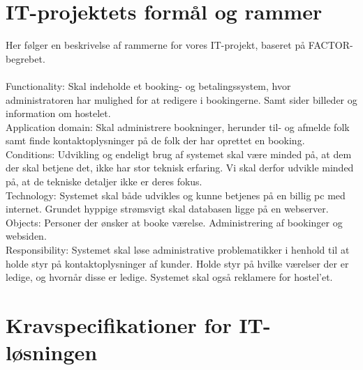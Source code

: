 \documentclass[12pt,a4paper]{article}
\begin{document}
\newpage
\section{IT-projektets formål og rammer}
Her følger en beskrivelse af rammerne for vores IT-projekt, baseret på FACTOR-begrebet.
\\\\
Functionality: Skal indeholde et booking- og betalingssystem, hvor administratoren har mulighed for at redigere i bookingerne. Samt sider billeder og information om hostelet. \\

Application domain: Skal administrere bookninger, herunder til- og afmelde folk samt finde kontaktoplysninger på de folk der har oprettet en booking.\\
 
Conditions: Udvikling og endeligt brug af systemet skal være minded på, at dem der skal betjene det, ikke har stor teknisk erfaring. Vi skal derfor udvikle minded på, at de tekniske detaljer ikke er deres fokus.\\

Technology: Systemet skal både udvikles og kunne betjenes på en billig pc med internet. Grundet hyppige strømsvigt skal databasen ligge på en webserver. \\

Objects: Personer der ønsker at booke værelse. Administrering af bookinger og websiden.\\

Responsibility: Systemet skal løse administrative problematikker i henhold til at holde styr på kontaktoplysninger af kunder. Holde styr på hvilke værelser der er ledige, og hvornår disse er ledige. Systemet skal også reklamere for hostel'et.\\
\newpage
\section{Kravspecifikationer for IT-løsningen}
\end{document}
